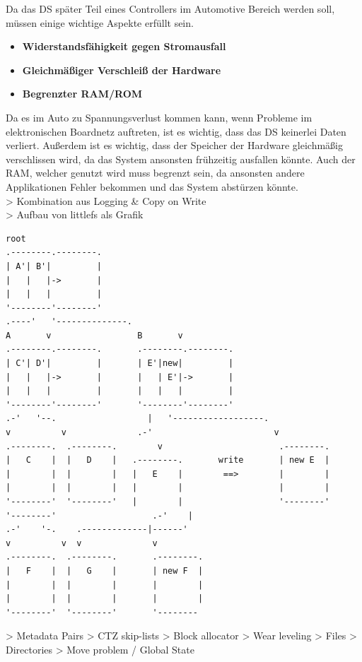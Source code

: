 Da das \acl{DS} später Teil eines Controllers im Automotive Bereich werden soll, müssen einige wichtige Aspekte erfüllt sein.

\begin{itemize}
	\item \textbf{Widerstandsfähigkeit gegen Stromausfall}
	\item \textbf{Gleichmäßiger Verschleiß der Hardware}
	\item \textbf{Begrenzter RAM/ROM}
\end{itemize}

Da es im Auto zu Spannungsverlust kommen kann, wenn Probleme im elektronischen Boardnetz auftreten,
ist es wichtig, dass das \acl{DS} keinerlei Daten verliert.
Außerdem ist es wichtig, dass der Speicher der Hardware gleichmäßig verschlissen wird,
da das System ansonsten frühzeitig ausfallen könnte.
Auch der RAM, welcher genutzt wird muss begrenzt sein, da ansonsten andere Applikationen Fehler bekommen und
das System abstürzen könnte.\\


> Kombination aus Logging \& Copy on Write\\
> Aufbau von littlefs als Grafik\\
\begin{lstlisting}[basicstyle=\tiny]
                 root
.--------.--------.
| A'| B'|         |
|   |   |->       |
|   |   |         |
'--------'--------'
.----'   '--------------.
A       v                 B       v
.--------.--------.       .--------.--------.
| C'| D'|         |       | E'|new|         |
|   |   |->       |       |   | E'|->       |
|   |   |         |       |   |   |         |
'--------'--------'       '--------'--------'
.-'   '--.                  |   '------------------.
v          v              .-'                        v
.--------.  .--------.        v                       .--------.
|   C    |  |   D    |   .--------.       write       | new E  |
|        |  |        |   |   E    |        ==>        |        |
|        |  |        |   |        |                   |        |
'--------'  '--------'   |        |                   '--------'
'--------'                   .-'    |
.-'    '-.    .-------------|------'
v          v  v              v
.--------.  .--------.       .--------.
|   F    |  |   G    |       | new F  |
|        |  |        |       |        |
|        |  |        |       |        |
'--------'  '--------'       '--------
\end{lstlisting}
> Metadata Pairs
> CTZ skip-lists
> Block allocator
> Wear leveling
> Files
> Directories
> Move problem / Global State

